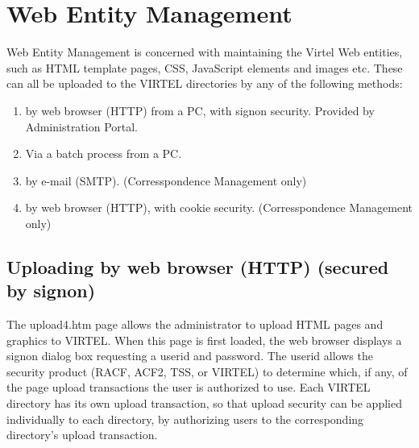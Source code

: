 \documentclass[letterpaper,10pt,english]{sphinxmanual}
\begin{document}
\newpage
{}\label{\detokenize{audit_operations_ and_performance:v457ap-web-entity-management}}

\section{Web Entity Management}
\label{\detokenize{audit_operations_ and_performance:web-entity-management}}\label{\detokenize{audit_operations_ and_performance:index-55}}
Web Entity Management is concerned with maintaining the Virtel Web entities, such as HTML template pages, CSS, JavaScript elements and images etc. These can all be uploaded to the VIRTEL directories by any of the following methods:
\begin{enumerate}
\item {} 
by web browser (HTTP) from a PC, with signon security. Provided by Administration Portal.

\item {} 
Via a batch process from a PC.

\item {} 
by e-mail (SMTP). (Corresspondence Management only)

\item {} 
by web browser (HTTP), with cookie security. (Corresspondence Management only)

\end{enumerate}
\label{\detokenize{audit_operations_ and_performance:v457ap-http-uploading-pages-signon}}

\subsection{Uploading by web browser (HTTP) (secured by signon)}
\label{\detokenize{audit_operations_ and_performance:index-56}}\label{\detokenize{audit_operations_ and_performance:uploading-by-web-browser-http-secured-by-signon}}
The upload4.htm page allows the administrator to upload HTML pages and graphics to VIRTEL. When this page is first loaded, the web browser displays a signon dialog box requesting a userid and password. The userid allows the security product (RACF, ACF2, TSS, or VIRTEL) to determine which, if any, of the page upload transactions the user is authorized to use. Each VIRTEL directory has its own upload transaction, so that upload security can be applied individually to each directory, by authorizing users to the corresponding directory’s upload transaction.
\end{document}
